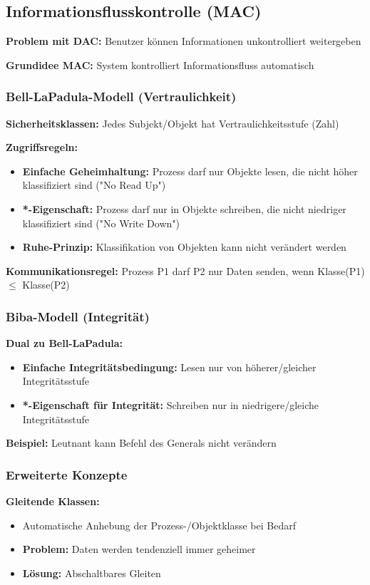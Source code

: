 \documentclass[9pt,a4paper]{extarticle}
\begin{document}
\begin{multicols*}{2}
\subsection{Informationsflusskontrolle (MAC)}
\textbf{Problem mit DAC:} Benutzer können Informationen unkontrolliert weitergeben

\textbf{Grundidee MAC:} System kontrolliert Informationsfluss automatisch

\subsubsection{Bell-LaPadula-Modell (Vertraulichkeit)}
\textbf{Sicherheitsklassen:} Jedes Subjekt/Objekt hat Vertraulichkeitsstufe (Zahl)

\textbf{Zugriffsregeln:}
\begin{itemize}
\item \textbf{Einfache Geheimhaltung:} Prozess darf nur Objekte lesen, die nicht höher klassifiziert sind ("No Read Up")
\item \textbf{*-Eigenschaft:} Prozess darf nur in Objekte schreiben, die nicht niedriger klassifiziert sind ("No Write Down")
\item \textbf{Ruhe-Prinzip:} Klassifikation von Objekten kann nicht verändert werden
\end{itemize}

\textbf{Kommunikationsregel:} Prozess P1 darf P2 nur Daten senden, wenn Klasse(P1) $\leq$ Klasse(P2)

\subsubsection{Biba-Modell (Integrität)}
\textbf{Dual zu Bell-LaPadula:}
\begin{itemize}
\item \textbf{Einfache Integritätsbedingung:} Lesen nur von höherer/gleicher Integritätsstufe
\item \textbf{*-Eigenschaft für Integrität:} Schreiben nur in niedrigere/gleiche Integritätsstufe
\end{itemize}

\textbf{Beispiel:} Leutnant kann Befehl des Generals nicht verändern

\subsubsection{Erweiterte Konzepte}
\textbf{Gleitende Klassen:}
\begin{itemize}
\item Automatische Anhebung der Prozess-/Objektklasse bei Bedarf
\item \textbf{Problem:} Daten werden tendenziell immer geheimer
\item \textbf{Lösung:} Abschaltbares Gleiten
\end{itemize}


\end{multicols*}
\end{document}
